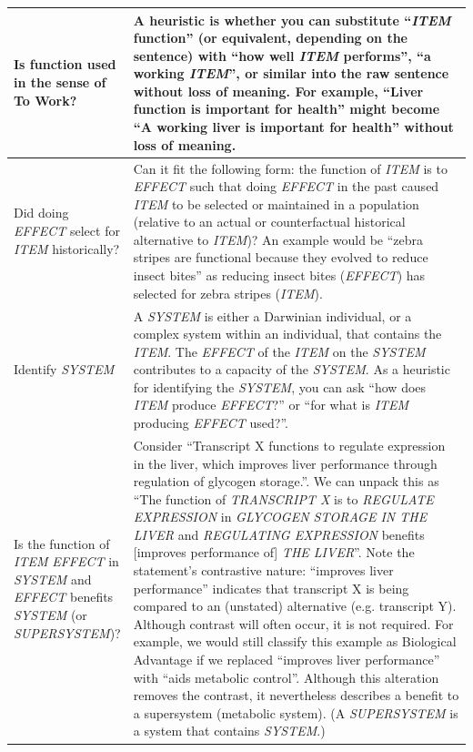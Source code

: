 \documentclass{article}
\begin{document}
\begin{landscape}
\begin{table}
\begin{tabular}{|p{0.17\linewidth}|p{0.97\linewidth}|}
    \hline
    Is function used in the sense of To Work? & A heuristic is whether you can substitute ``\emph{ITEM} function'' (or equivalent, depending on the sentence) with ``how well \emph{ITEM} performs'', ``a working \emph{ITEM}'', or similar into the raw sentence without loss of meaning. For example, ``Liver function is important for health'' might become ``A working liver is important for health'' without loss of meaning.\\
    \hline
    Did doing \emph{EFFECT} select for \emph{ITEM} historically? & Can it fit the following form: the function of \emph{ITEM} is to \emph{EFFECT} such that doing \emph{EFFECT} in the past caused \emph{ITEM} to be selected or maintained in a population (relative to an actual or counterfactual historical alternative to \emph{ITEM})? An example would be ``zebra stripes are functional because they evolved to reduce insect bites'' as reducing insect bites (\emph{EFFECT}) has selected for zebra stripes (\emph{ITEM}).\\
    \hline
    Identify \emph{SYSTEM} & A \emph{SYSTEM} is either a Darwinian individual, or a complex system within an individual, that contains the \emph{ITEM}. The \emph{EFFECT} of the \emph{ITEM} on the \emph{SYSTEM} contributes to a capacity of the \emph{SYSTEM}. As a heuristic for identifying the \emph{SYSTEM}, you can ask  ``how does \emph{ITEM} produce \emph{EFFECT}?'' or ``for what is \emph{ITEM} producing \emph{EFFECT} used?''. \\
    \hline
    Is the function of \emph{ITEM} \emph{EFFECT} in \emph{SYSTEM} and \emph{EFFECT} benefits \emph{SYSTEM} (or \emph{SUPERSYSTEM})? & Consider ``Transcript X functions to regulate expression in the liver, which improves liver performance through regulation of glycogen storage.''. We can unpack this as ``The function of \emph{TRANSCRIPT X} is to \emph{REGULATE EXPRESSION} in \emph{GLYCOGEN STORAGE IN THE LIVER} and \emph{REGULATING EXPRESSION} benefits [improves performance of] \emph{THE LIVER}''. Note the statement's contrastive nature: ``improves liver performance'' indicates that transcript X is being compared to an (unstated) alternative (e.g. transcript Y). Although contrast will often occur, it is not required. For example, we would still classify this example as Biological Advantage if we replaced ``improves liver performance'' with ``aids metabolic control''. Although this alteration removes the contrast, it nevertheless describes a benefit to a supersystem (metabolic system). (A \emph{SUPERSYSTEM} is a system that contains \emph{SYSTEM}.) \\

\end{tabular}
\end{table}
\end{landscape}
\end{document}
